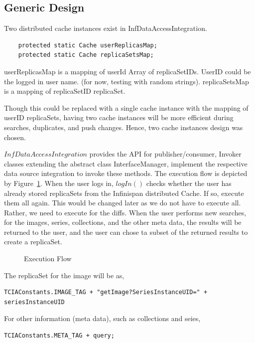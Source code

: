 \documentclass[conference]{IEEEtran}
\begin{document}
\subsection{Generic Design}
Two distributed cache instances exist in InfDataAccessIntegration.
\begin{lstlisting}  
    protected static Cache userReplicasMap;
    protected static Cache replicaSetsMap;
\end{lstlisting}  
userReplicasMap is a mapping of userId  Array of replicaSetIDs. UserID could be the logged in user name. (for now, testing with random strings).
replicaSetsMap is a mapping of replicaSetID  replicaSet.

Though this could be replaced with a single cache instance with the mapping of userID  replicaSets, having two cache instances will be more efficient during searches, duplicates, and push changes. Hence, two cache instances design was chosen.

$InfDataAccessIntegration$ provides the API for publisher/consumer, Invoker classes extending the abstract class InterfaceManager, implement the respective data source integration to invoke these methods. The execution flow is depicted by Figure~\ref{fig:execution}. When the user logs in, $logIn()$ checks whether the user has already stored replicaSets from the Infinispan distributed Cache. If so, execute them all again. This would be changed later as we do not have to execute all. Rather, we need to execute for the diffs. When the user performs new searches, for the images, series, collections, and the other meta data, the results will be returned to the user, and the user can chose ta subset of the returned results to create a replicaSet.
\begin{figure}[!htbp]
\begin{center}
\end{center}
 \caption{Execution Flow}
 \label{fig:execution}
\end{figure}
The replicaSet for the image will be as,
\begin{lstlisting}  
TCIAConstants.IMAGE_TAG + "getImage?SeriesInstanceUID=" + seriesInstanceUID
\end{lstlisting}  
For other information (meta data), such as collections and seies,
\begin{lstlisting}  
TCIAConstants.META_TAG + query;
\end{lstlisting}  
\end{document}
